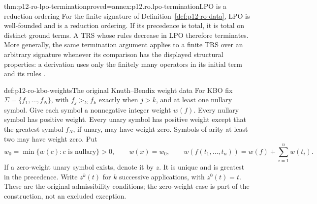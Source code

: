 \begin{hbtheorem}{thm:p12-ro-lpo-termination}{proved=annex:p12.ro.lpo-termination}{LPO is a reduction ordering}
For the finite signature of Definition~\ref{def:p12-ro-data}, LPO is
well-founded and is a reduction ordering. If its precedence is total,
it is total on distinct ground terms. A TRS whose rules decrease in LPO
therefore terminates. More generally, the same termination argument
applies to a finite TRS over an arbitrary signature whenever its
comparison has the displayed structural properties: a derivation uses
only the finitely many operators in its initial term and its rules
\cite[\S2]{Dershowitz1982}.
\end{hbtheorem}

\begin{hbdefinition}{def:p12-ro-kbo-weights}{The original Knuth--Bendix weight data}
For KBO fix \(\Sigma=\{f_1,\ldots,f_N\}\), with
\(f_j>_\Sigma f_k\) exactly when \(j>k\), and at least one
nullary symbol. Give each symbol a nonnegative integer weight \(w(f)\).
Every nullary symbol has positive weight. Every unary symbol has
positive weight except that the greatest symbol \(f_N\), if unary,
may have weight zero. Symbols of arity at least two may have weight zero.
Put
\[
 w_0=\min\{w(c):c\text{ is nullary}\}>0,
 \qquad w(x)=w_0,
 \qquad
 w(f(t_1,\ldots,t_n))=w(f)+\sum_{i=1}^n w(t_i).
\]
If a zero-weight unary symbol exists, denote it by \(z\). It is
unique and is greatest in the precedence. Write \(z^k(t)\) for
\(k\) successive applications, with \(z^0(t)=t\).
These are the original admissibility conditions; the zero-weight case
is part of the construction, not an excluded exception.
\end{hbdefinition}

